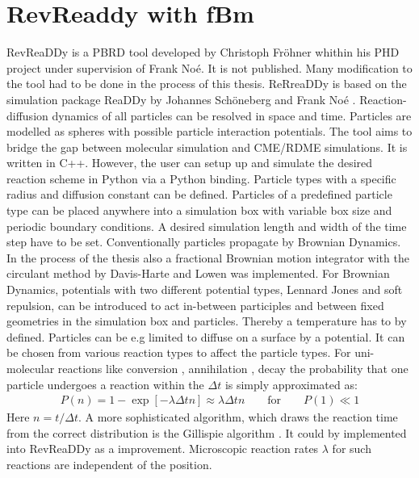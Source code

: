 \documentclass[
  a4paper,BCOR10mm,oneside,
  headsepline,footsepline,%
  fleqn,openbib
]{scrbook}
\begin{document}
\section{RevReaddy with fBm} 
RevReaDDy is a PBRD tool developed by Christoph Fröhner whithin his PHD project under supervision of Frank Noé. It is not published. Many modification to the tool had to be done in the process of this thesis. ReRreaDDy is based on the simulation package ReaDDy by Johannes Schöneberg and Frank Noé \cite{10.1371/journal.pone.0074261}. Reaction-diffusion dynamics of all particles can be resolved in space and time. Particles are modelled as spheres with possible particle interaction potentials. The tool aims to bridge the gap between molecular simulation and CME/RDME simulations. It is written in C++. However, the user can setup up and simulate the desired reaction scheme in Python via a Python binding. Particle types with a specific radius and diffusion constant can be defined. Particles of a predefined particle type can be placed anywhere into a simulation box with variable box size and periodic boundary conditions. A desired simulation length and width of the time step have to be set. Conventionally particles propagate by Brownian Dynamics. In the process of the thesis also a fractional Brownian motion integrator with the circulant method by Davis-Harte \cite{Dieker2004}  and Lowen \cite{Lowen1999} was implemented. For Brownian Dynamics, potentials with two different potential types, Lennard Jones and soft repulsion, can be introduced to act in-between participles and between fixed geometries in the simulation box and particles. Thereby a temperature has to by defined. Particles can be e.g limited to diffuse on a surface by a potential. It can be chosen from various reaction types to affect the particle types. For uni-molecular reactions like conversion , annihilation , decay  the probability that one particle undergoes a reaction within the $\Delta t$ is simply approximated as:
\begin{align} \label{propabilityreaction}
 P(n)=1- \exp[-\lambda \Delta t n] \approx \lambda \Delta t n \qquad \text{for} \qquad P(1)\ll 1
\end{align}
Here $n=t/\Delta t$. A more sophisticated algorithm, which draws the reaction time from the correct distribution is the Gillispie algorithm \cite{Gillespie1977}. It could by implemented into RevReaDDy as a improvement. Microscopic reaction rates $\lambda$ for such reactions are independent of the position.
\end{document}
